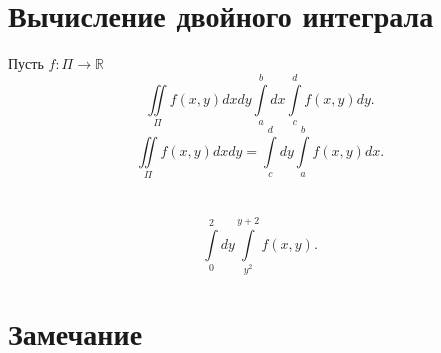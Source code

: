 \documentclass[14pt]{extarticle} \usepackage{fontspec}
\begin{document}
    \section{Вычисление двойного интеграла}
    Пусть $f: \Pi \to \mathbb{R}$
    \[
    \iint\limits_{\Pi} f(x,y) dx dy \int\limits_{a}^{b} dx \int\limits_{c}^{d} f(x,y)  dy
    .\] 
    \[
    \iint\limits_{\Pi} f(x,y) dx dy = \int\limits_{c}^{d} dy \int\limits_{a}^{b} f(x,y)   dx
    .\] 
    \section{}
    \[
        \int\limits_{0}^{2} dy \int\limits_{y^2}^{y+2} f(x,y)   
    .\] 
\section{Замечание}
\end{document}
